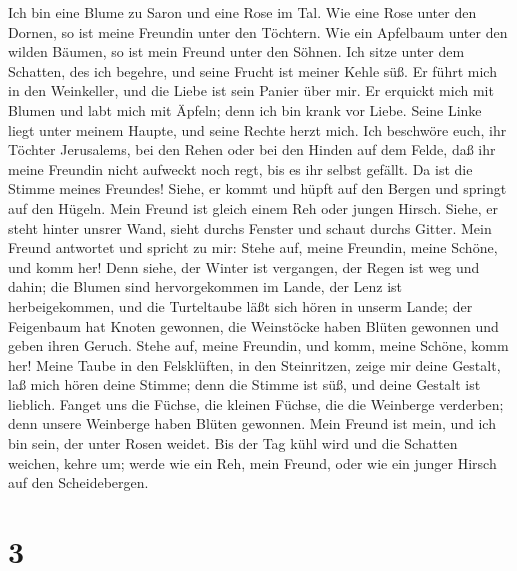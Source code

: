  Ich bin eine Blume zu Saron und eine Rose im Tal.
 Wie eine Rose unter den Dornen, so ist meine Freundin unter
den Töchtern.  Wie ein Apfelbaum unter den wilden Bäumen, so
ist mein Freund unter den Söhnen. Ich sitze unter dem Schatten, des ich
begehre, und seine Frucht ist meiner Kehle süß.  Er führt
mich in den Weinkeller, und die Liebe ist sein Panier über mir.
 Er erquickt mich mit Blumen und labt mich mit Äpfeln; denn
ich bin krank vor Liebe.  Seine Linke liegt unter meinem
Haupte, und seine Rechte herzt mich.  Ich beschwöre euch,
ihr Töchter Jerusalems, bei den Rehen oder bei den Hinden auf dem Felde,
daß ihr meine Freundin nicht aufweckt noch regt, bis es ihr selbst
gefällt.  Da ist die Stimme meines Freundes! Siehe, er kommt
und hüpft auf den Bergen und springt auf den Hügeln.  Mein
Freund ist gleich einem Reh oder jungen Hirsch. Siehe, er steht hinter
unsrer Wand, sieht durchs Fenster und schaut durchs Gitter.
 Mein Freund antwortet und spricht zu mir: Stehe auf, meine
Freundin, meine Schöne, und komm her!  Denn siehe, der
Winter ist vergangen, der Regen ist weg und dahin;  die
Blumen sind hervorgekommen im Lande, der Lenz ist herbeigekommen, und
die Turteltaube läßt sich hören in unserm Lande;  der
Feigenbaum hat Knoten gewonnen, die Weinstöcke haben Blüten gewonnen und
geben ihren Geruch. Stehe auf, meine Freundin, und komm, meine Schöne,
komm her!  Meine Taube in den Felsklüften, in den
Steinritzen, zeige mir deine Gestalt, laß mich hören deine Stimme; denn
die Stimme ist süß, und deine Gestalt ist lieblich.  Fanget
uns die Füchse, die kleinen Füchse, die die Weinberge verderben; denn
unsere Weinberge haben Blüten gewonnen.  Mein Freund ist
mein, und ich bin sein, der unter Rosen weidet.  Bis der
Tag kühl wird und die Schatten weichen, kehre um; werde wie ein Reh,
mein Freund, oder wie ein junger Hirsch auf den Scheidebergen.

\hypertarget{section-2}{%
\section{3}\label{section-2}}

